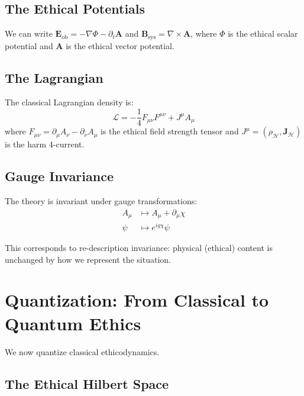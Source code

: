 \documentclass[12pt]{article}
\begin{document}
\subsection{The Ethical Potentials}

We can write $\mathbf{E}_{\mathrm{ob}} = -\nabla\Phi - \partial_t \mathbf{A}$ and $\mathbf{B}_{\mathrm{sys}} = \nabla \times \mathbf{A}$, where $\Phi$ is the ethical scalar potential and $\mathbf{A}$ is the ethical vector potential.

\subsection{The Lagrangian}

The classical Lagrangian density is:
\begin{equation}
    \mathcal{L} = -\frac{1}{4} F_{\mu\nu} F^{\mu\nu} + J^\mu A_\mu
\end{equation}
where $F_{\mu\nu} = \partial_\mu A_\nu - \partial_\nu A_\mu$ is the ethical field strength tensor and $J^\mu = (\rho_{\mathcal{H}}, \mathbf{J}_{\mathcal{H}})$ is the harm 4-current.

\subsection{Gauge Invariance}

The theory is invariant under gauge transformations:
\begin{align}
    A_\mu &\mapsto A_\mu + \partial_\mu \chi \\
    \psi &\mapsto e^{ig\chi} \psi
\end{align}

This corresponds to re-description invariance: physical (ethical) content is unchanged by how we represent the situation.

\section{Quantization: From Classical to Quantum Ethics}

We now quantize classical ethicodynamics.

\subsection{The Ethical Hilbert Space}
\end{document}
